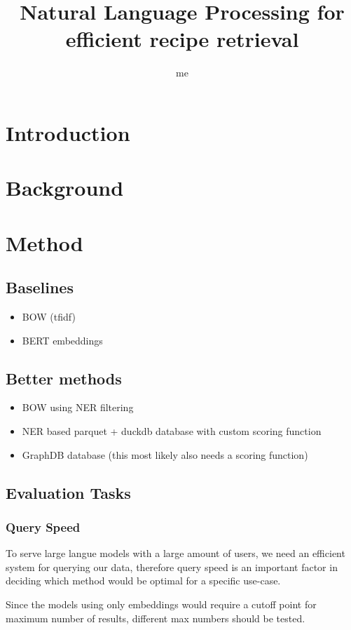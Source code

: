 \documentclass{article}
\title{Natural Language Processing for efficient recipe retrieval}
\date{}
\author{me}
\begin{document}
\maketitle

\section{Introduction}

\section{Background}

\section{Method}
\subsection{Baselines}
\begin{itemize}
    \item BOW (tfidf)
    \item BERT embeddings
\end{itemize}

\subsection{Better methods}
\begin{itemize}
    \item BOW using NER filtering
    \item NER based parquet + duckdb database with custom scoring function
    \item GraphDB database (this most likely also needs a scoring function)
\end{itemize}

\subsection{Evaluation Tasks}
\subsubsection{Query Speed}
To serve large langue models with a large amount of users, we need an efficient
system for querying our data, therefore query speed is an important factor in
deciding which method would be optimal for a specific use-case.

Since the models using only embeddings would require a cutoff point for
maximum number of results, different max numbers should be tested.
\end{document}
